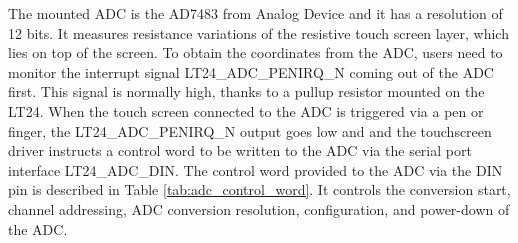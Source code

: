 \documentclass[11pt]{report}
\begin{document}
The mounted ADC is the AD7483 from Analog Device and it has a resolution of 12 bits. It measures resistance variations of the resistive touch screen layer, which lies on top of the screen. To obtain the coordinates from the ADC, users need to monitor the interrupt signal LT24\_ADC\_PENIRQ\_N coming out of the ADC first. This signal is normally high, thanks to a pullup resistor mounted on the LT24. When the touch screen connected to the
ADC is triggered via a pen or finger, the LT24\_ADC\_PENIRQ\_N output goes low and and the touchscreen driver instructs a control word to be written to the ADC via the serial port interface LT24\_ADC\_DIN. The control word provided to the ADC via the DIN pin is described in Table \ref{tab:adc_control_word}. It controls the conversion start, channel addressing, ADC conversion resolution, configuration, and power-down of the ADC.
\end{document}
